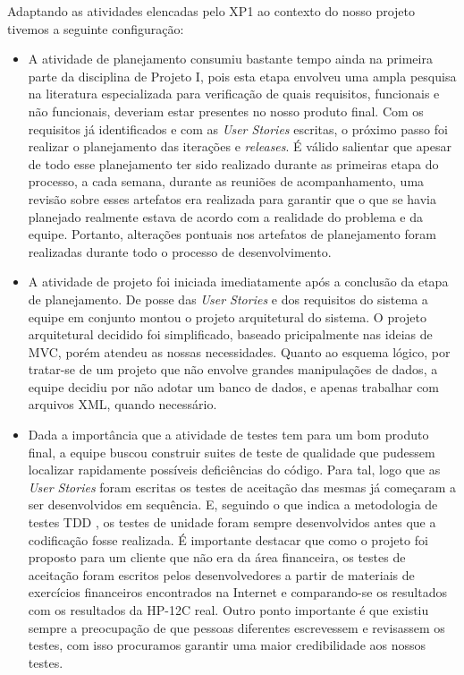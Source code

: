Adaptando as atividades elencadas pelo XP1 ao contexto do nosso projeto tivemos a seguinte configuração: 
\begin{itemize}
 \item  A atividade de planejamento consumiu bastante tempo ainda na primeira parte da disciplina de Projeto I, pois esta etapa envolveu uma ampla pesquisa na literatura especializada para verificação de quais requisitos, funcionais e não funcionais, deveriam estar presentes no nosso produto final. Com os requisitos já identificados e com as \textit{User Stories} escritas, o próximo passo foi realizar o planejamento das iterações e \textit{releases}. É válido salientar que apesar de todo esse planejamento ter sido realizado durante as primeiras etapa do processo, a cada semana, durante as reuniões de acompanhamento, uma revisão sobre esses artefatos era realizada para garantir que o que se havia planejado realmente estava de acordo com a realidade do problema e da equipe. Portanto, alterações pontuais nos artefatos de planejamento foram realizadas durante todo o processo de desenvolvimento.
 \item A atividade de projeto foi iniciada imediatamente após a conclusão da etapa de planejamento. De posse das \textit{User Stories} e dos requisitos do sistema a equipe em conjunto montou o projeto arquitetural do sistema. O projeto arquitetural decidido foi simplificado, baseado pricipalmente nas ideias de MVC, porém atendeu as nossas necessidades. Quanto ao esquema lógico, por tratar-se de um projeto que não envolve grandes manipulações de dados, a equipe decidiu por não adotar um banco de dados, e apenas trabalhar com arquivos XML, quando necessário.
 \item Dada a importância que a atividade de testes tem para um bom produto final, a equipe buscou construir suites de teste de qualidade que pudessem localizar rapidamente possíveis deficiências do código. Para tal, logo que as \textit{User Stories} foram escritas os testes de aceitação das mesmas já começaram a ser desenvolvidos em sequência. E, seguindo o que indica a metodologia de testes TDD \cite{TDD}, os testes de unidade foram sempre desenvolvidos antes que a codificação fosse realizada. É importante destacar que como o projeto foi proposto para um cliente que não era da área financeira, os testes de aceitação foram escritos pelos desenvolvedores a partir de materiais de exercícios financeiros encontrados na Internet e comparando-se os resultados com os resultados da HP-12C real. Outro ponto importante é que existiu sempre a preocupação de que pessoas diferentes escrevessem e revisassem os testes, com isso procuramos garantir uma maior credibilidade aos nossos testes. 

\end{itemize}
